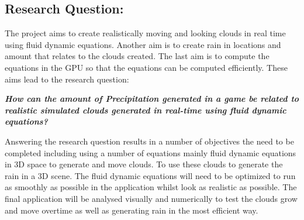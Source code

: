\subsection{Research Question:}
\label{sec:rq}
The project aims to create realistically moving and looking clouds in real time using fluid dynamic equations.
Another aim is to create rain in locations and amount that relates to the clouds created.
The last aim is to compute the equations in the GPU so that the equations can be computed efficiently.
These aims lead to the research question:

\textit{\textbf{How can the amount of Precipitation generated in a game be related to realistic simulated clouds generated in real-time using fluid dynamic equations?}}

Answering the research question results in a number of objectives the need to be completed including using a number of equations mainly fluid dynamic equations in 3D space to generate and move clouds.
To use these clouds to generate the rain in a 3D scene. 
The fluid dynamic equations will need to be optimized to run as smoothly as possible in the application whilst look as realistic as possible.
The final application will be analysed visually and numerically to test the clouds grow and move overtime as well as generating rain in the most efficient way.
